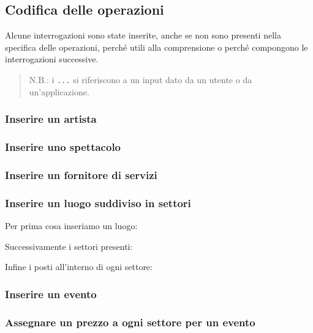 \documentclass[a4paper,11pt]{article}
\begin{document}
\subsection{Codifica delle operazioni}
Alcune interrogazioni sono state inserite, anche se non sono presenti 
nella specifica delle operazioni, perché utili alla comprensione o perché
compongono le interrogazioni successive.

\begin{quote}
  N.B.: i \texttt{...} si riferiscono a un input dato da un utente o da un'applicazione.
\end{quote}

\subsubsection{Inserire un artista}


\subsubsection{Inserire uno spettacolo}


\subsubsection{Inserire un fornitore di servizi}


\subsubsection{Inserire un luogo suddiviso in settori}

Per prima cosa inseriamo un luogo:

Successivamente i settori presenti:

Infine i posti all'interno di ogni settore:


\subsubsection{Inserire un evento}


\subsubsection{Assegnare un prezzo a ogni settore per un evento}

\end{document}
